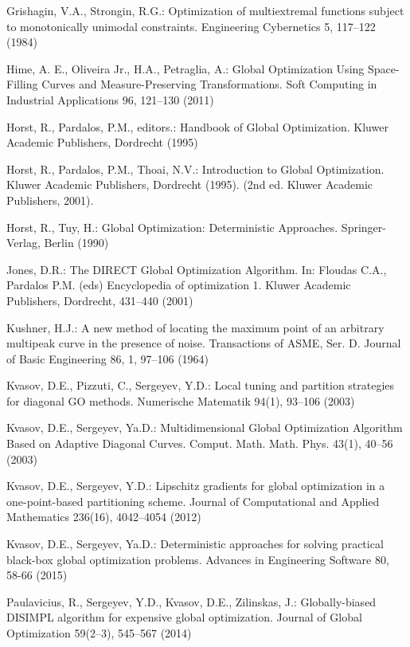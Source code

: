 \documentclass[smallextended]{svjour3}
\begin{document}
\begin{thebibliography}{}
Grishagin, V.A., Strongin, R.G.: Optimization of multiextremal functions subject to monotonically unimodal constraints. Engineering Cybernetics 5, 117--122 (1984)

Hime, A. E., Oliveira Jr., H.A., Petraglia, A.: Global Optimization Using Space-Filling Curves and Measure-Preserving Transformations. Soft Computing in Industrial Applications 96, 121--130 (2011)

Horst, R., Pardalos, P.M., editors.: Handbook of Global Optimization. Kluwer Academic Publishers, Dordrecht (1995)

Horst, R., Pardalos, P.M., Thoai, N.V.: Introduction to Global Optimization. Kluwer Academic Publishers, Dordrecht (1995). (2nd ed. Kluwer Academic Publishers, 2001).

Horst, R., Tuy, H.: Global Optimization: Deterministic Approaches. Springer-Verlag, Berlin (1990)

Jones, D.R.: The DIRECT Global Optimization Algorithm. In: Floudas C.A., Pardalos P.M. (eds) Encyclopedia of optimization 1. Kluwer Academic Publishers, Dordrecht, 431--440 (2001)

Kushner, H.J.: A new method of locating the maximum point of an arbitrary multipeak curve in the presence of noise. Transactions of ASME, Ser. D. Journal of Basic Engineering 86, 1, 97--106 (1964)

Kvasov, D.E., Pizzuti, C., Sergeyev, Y.D.: Local tuning and partition strategies for diagonal GO methods. Numerische Matematik 94(1),  93--106  (2003)

Kvasov, D.E., Sergeyev, Ya.D.: Multidimensional Global Optimization Algorithm Based on Adaptive Diagonal Curves. Comput. Math. Math. Phys. 43(1), 40--56 (2003)

Kvasov, D.E., Sergeyev, Y.D.: Lipschitz gradients for global optimization in a one-point-based partitioning scheme.  Journal of Computational and Applied Mathematics  236(16),  4042--4054 (2012)

Kvasov, D.E., Sergeyev, Ya.D.: Deterministic approaches for solving practical black-box global optimization problems. Advances in Engineering Software 80, 58-66 (2015)

Paulavicius, R., Sergeyev, Y.D., Kvasov, D.E., Zilinskas, J.: Globally-biased DISIMPL algorithm for expensive global optimization. Journal of Global Optimization 59(2--3), 545--567 (2014)


\end{thebibliography}
\end{document}
